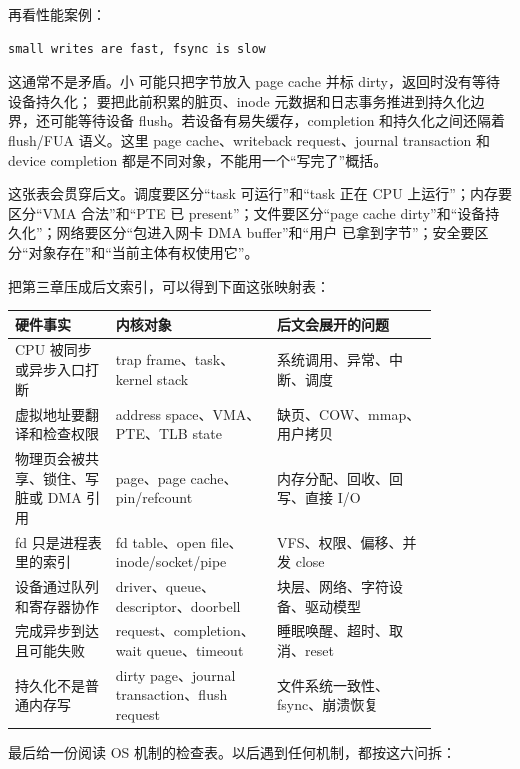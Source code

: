 再看性能案例：

\begin{lstlisting}
small writes are fast, fsync is slow
\end{lstlisting}

这通常不是矛盾。小  可能只把字节放入 page cache 并标 dirty，返回时没有等待设备持久化； 要把此前积累的脏页、inode 元数据和日志事务推进到持久化边界，还可能等待设备 flush。若设备有易失缓存，completion 和持久化之间还隔着 flush/FUA 语义。这里 page cache、writeback request、journal transaction 和 device completion 都是不同对象，不能用一个“写完了”概括。

这张表会贯穿后文。调度要区分“task 可运行”和“task 正在 CPU 上运行”；内存要区分“VMA 合法”和“PTE 已 present”；文件要区分“page cache dirty”和“设备持久化”；网络要区分“包进入网卡 DMA buffer”和“用户  已拿到字节”；安全要区分“对象存在”和“当前主体有权使用它”。

把第三章压成后文索引，可以得到下面这张映射表：

\begin{longtable}{p{0.2\linewidth}p{0.32\linewidth}p{0.32\linewidth}}
\toprule
硬件事实 & 内核对象 & 后文会展开的问题 \\
\midrule
CPU 被同步或异步入口打断 & trap frame、task、kernel stack & 系统调用、异常、中断、调度 \\
虚拟地址要翻译和检查权限 & address space、VMA、PTE、TLB state & 缺页、COW、mmap、用户拷贝 \\
物理页会被共享、锁住、写脏或 DMA 引用 & page、page cache、pin/refcount & 内存分配、回收、回写、直接 I/O \\
fd 只是进程表里的索引 & fd table、open file、inode/socket/pipe & VFS、权限、偏移、并发 close \\
设备通过队列和寄存器协作 & driver、queue、descriptor、doorbell & 块层、网络、字符设备、驱动模型 \\
完成异步到达且可能失败 & request、completion、wait queue、timeout & 睡眠唤醒、超时、取消、reset \\
持久化不是普通内存写 & dirty page、journal transaction、flush request & 文件系统一致性、fsync、崩溃恢复 \\
\bottomrule
\end{longtable}

最后给一份阅读 OS 机制的检查表。以后遇到任何机制，都按这六问拆：

